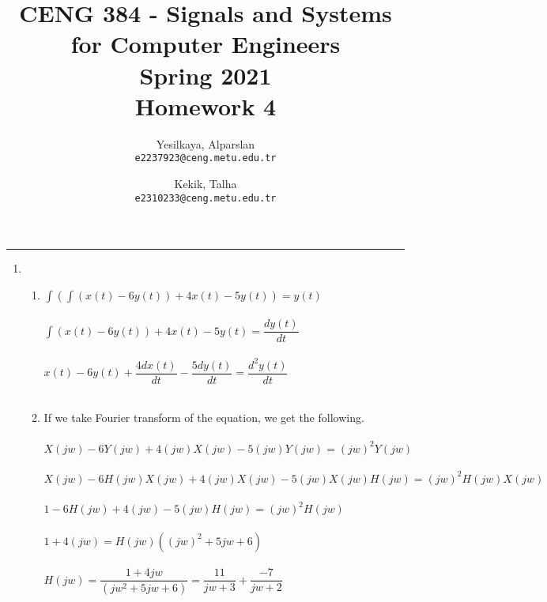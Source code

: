 \documentclass[10pt,a4paper, margin=1in]{article}
\author{
  Yesilkaya, Alparslan\\
  \texttt{e2237923@ceng.metu.edu.tr}
  \and
  Kekik, Talha\\
  \texttt{e2310233@ceng.metu.edu.tr}
}
\title{CENG 384 - Signals and Systems for Computer Engineers \\
Spring 2021 \\
Homework 4}
\begin{document}
\maketitle



\noindent\rule{19cm}{1.2pt}

\begin{enumerate}

\item %
    \begin{enumerate}
    \item %
    $\int(\int(x(t)-6y(t))+4x(t)-5y(t)) = y(t)$\\\\
    $\int(x(t)-6y(t))+4x(t)-5y(t)= \dfrac{dy(t)}{dt}$\\\\
    $x(t)-6y(t) + \dfrac{4dx(t)}{dt} - \dfrac{5dy(t)}{dt}=\dfrac{d^{2}y(t)}{dt}$\\\\

    \item %
    If we take Fourier transform of the equation, we get the following.\\\\
   $X(jw) -6Y(jw)+4(jw)X(jw)-5(jw)Y(jw)=(jw)^{2}Y(jw)$\\\\
   $X(jw)-6H(jw)X(jw)+4(jw)X(jw)-5(jw)X(jw)H(jw) = (jw)^{2}H(jw)X(jw)$\\\\
   $1-6H(jw)+4(jw)-5(jw)H(jw)=(jw)^{2}H(jw)$\\\\
   $1+4(jw)=H(jw)((jw)^{2}+5jw +6)$\\\\
   $H(jw)=\dfrac{1+4jw}{(jw^{2}+5jw+6)}=\dfrac{11}{jw+3}+\dfrac{-7}{jw+2}$\\\\


\end{enumerate}
\end{enumerate}
\end{document}

